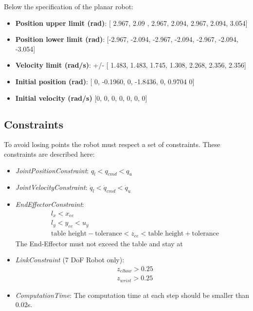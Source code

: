     Below the specification of the planar robot:
    \begin{itemize}
        \item \textbf{Position upper limit (rad)}: [ 2.967, 2.09 , 2.967, 2.094, 2.967, 2.094, 3.054]
        \item \textbf{Position lower limit (rad)}: [-2.967, -2.094, -2.967, -2.094, -2.967, -2.094, -3.054]
        \item \textbf{Velocity limit (rad/s)}: +/- [ 1.483, 1.483, 1.745, 1.308, 2.268, 2.356, 2.356]   
        \item \textbf{Initial position (rad)}: [ 0, -0.1960, 0, -1.8436, 0, 0.9704 0]
        \item \textbf{Initial velocity (rad/s)} [0, 0, 0, 0, 0, 0, 0]
    \end{itemize}


\subsection{Constraints}
To avoid losing points the robot must respect a set of constraints.
These constraints are described here:

\begin{itemize}
    \item \textit{JointPositionConstraint}: $q_l < q_{cmd} < q_u$
    \item \textit{JointVelocityConstraint}: $\dot{q}_l < \dot{q}_{cmd} < \dot{q}_u$
    \item \textit{EndEffectorConstraint}:
        \begin{equation*}
            \begin{aligned}
                & l_x < x_{ee} \\
                & l_y < y_{ee} < u_y \\
                & \text{table height} - \text{tolerance} < z_{ee} < \text{table height} + \text{tolerance}
            \end{aligned}
        \end{equation*}
    The End-Effector must not exceed the table and stay at
    \item \textit{LinkConstraint} (7 DoF Robot only):
    \begin{equation*}
        \begin{aligned}
            & z_{elbow} > 0.25 \\
            & z_{wrist} > 0.25
        \end{aligned}
    \end{equation*}
    \item \textit{ComputationTime}: The computation time at each step should be smaller than 0.02s.
\end{itemize}

